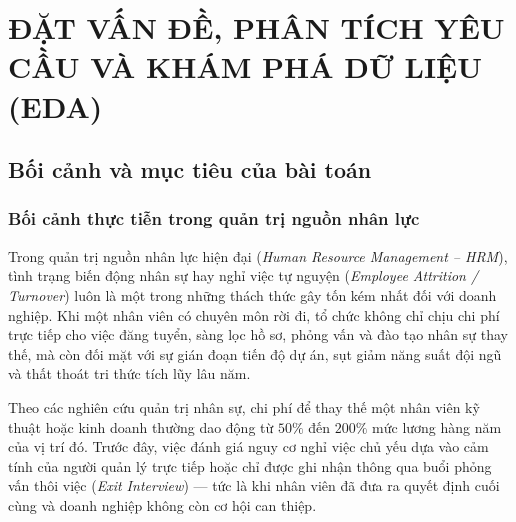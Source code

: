 \chapter[ĐẶT VẤN ĐỀ, PHÂN TÍCH YÊU CẦU VÀ KHÁM PHÁ DỮ LIỆU (EDA)]{ĐẶT VẤN ĐỀ, PHÂN TÍCH YÊU CẦU VÀ KHÁM PHÁ DỮ LIỆU (EDA)}

\section{Bối cảnh và mục tiêu của bài toán}

\subsection{Bối cảnh thực tiễn trong quản trị nguồn nhân lực}
Trong quản trị nguồn nhân lực hiện đại (\textit{Human Resource Management -- HRM}), tình trạng biến động nhân sự hay nghỉ việc tự nguyện (\textit{Employee Attrition / Turnover}) luôn là một trong những thách thức gây tốn kém nhất đối với doanh nghiệp. Khi một nhân viên có chuyên môn rời đi, tổ chức không chỉ chịu chi phí trực tiếp cho việc đăng tuyển, sàng lọc hồ sơ, phỏng vấn và đào tạo nhân sự thay thế, mà còn đối mặt với sự gián đoạn tiến độ dự án, sụt giảm năng suất đội ngũ và thất thoát tri thức tích lũy lâu năm.

Theo các nghiên cứu quản trị nhân sự, chi phí để thay thế một nhân viên kỹ thuật hoặc kinh doanh thường dao động từ $50\%$ đến $200\%$ mức lương hàng năm của vị trí đó. Trước đây, việc đánh giá nguy cơ nghỉ việc chủ yếu dựa vào cảm tính của người quản lý trực tiếp hoặc chỉ được ghi nhận thông qua buổi phỏng vấn thôi việc (\textit{Exit Interview}) --- tức là khi nhân viên đã đưa ra quyết định cuối cùng và doanh nghiệp không còn cơ hội can thiệp.

